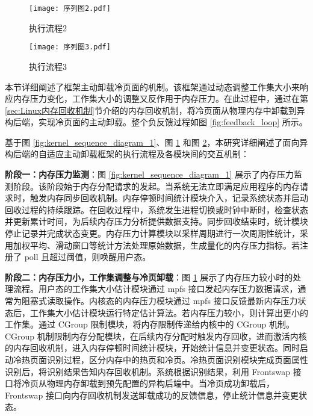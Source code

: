\begin{figure}[htb]
\centering
\texttt{[image: 序列图2.pdf]}
\caption{执行流程2}
\label{fig:kernel_sequence_diagram_2}
\end{figure}

\begin{figure}[htb]
\centering
\texttt{[image: 序列图3.pdf]}
\caption{执行流程3}
\label{fig:kernel_sequence_diagram_3}
\end{figure}

本节详细阐述了框架主动卸载冷页面的机制。该框架通过动态调整工作集大小来响应内存压力变化，工作集大小的调整又反作用于内存压力。在此过程中，通过在第\ref{sec:Linux内存回收机制}节介绍的内存回收机制，将冷页面从物理内存中卸载到异构后端，实现冷页面的主动卸载。整个负反馈过程如图 \ref{fig:feedback_loop} 所示。

基于图 \ref{fig:kernel_sequence_diagram_1}、图 \ref{fig:kernel_sequence_diagram_2} 和图 \ref{fig:kernel_sequence_diagram_3}，本研究详细阐述了面向异构后端的自适应主动卸载框架的执行流程及各模块间的交互机制：

\textbf{阶段一：内存压力监测}：图 \ref{fig:kernel_sequence_diagram_1} 展示了内存压力监测阶段。该阶段始于内存分配请求的发起。当系统无法立即满足应用程序的内存请求时，触发内存同步回收机制。内存停顿时间统计模块介入，记录系统状态并启动回收过程的持续跟踪。在回收过程中，系统发生进程切换或时钟中断时，检查状态并更新累计时间，为后续内存压力分析提供数据支持。同步回收结束时，统计模块停止记录并完成状态变更。内存压力计算模块以采样周期进行一次周期性统计，采用加权平均、滑动窗口等统计方法处理原始数据，生成量化的内存压力指标。若注册了 poll 且超过阈值，则唤醒用户态。

\textbf{阶段二：内存压力小，工作集调整与冷页卸载}：图 \ref{fig:kernel_sequence_diagram_2} 展示了内存压力较小时的处理流程。用户态的工作集大小估计模块通过 mpfs 接口发起内存压力数据请求，通常为阻塞式读取操作。内核态的内存压力模块通过 mpfs 接口反馈最新内存压力状态后，工作集大小估计模块运行特定估计算法。若内存压力较小，则计算出更小的工作集。通过  CGroup  限制模块，将内存限制传递给内核中的  CGroup  机制。 CGroup  机制限制内存分配模块，在后续内存分配时触发内存回收，进而激活内核的内存回收机制，进入内存停顿时间统计模块，开始统计信息并变更状态。同时启动冷热页面识别过程，区分内存中的热页和冷页。冷热页面识别模块完成页面属性识别后，将识别结果告知内存回收机制。系统根据识别结果，利用 Frontswap 接口将冷页从物理内存卸载到预先配置的异构后端中。当冷页成功卸载后，Frontswap 接口向内存回收机制发送卸载成功的反馈信息，停止统计信息并变更状态。

